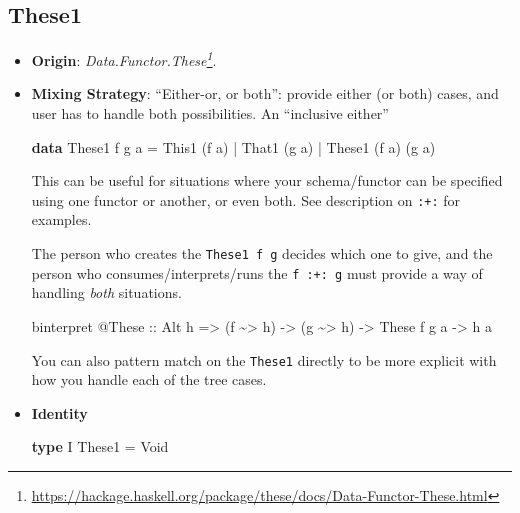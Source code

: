 \documentclass[]{article}
\newenvironment{Shaded}{}{}
\newcommand{\DataTypeTok}[1]{\textcolor[rgb]{0.56,0.13,0.00}{#1}}
\newcommand{\KeywordTok}[1]{\textcolor[rgb]{0.00,0.44,0.13}{\textbf{#1}}}
\newcommand{\NormalTok}[1]{#1}
\newcommand{\OperatorTok}[1]{\textcolor[rgb]{0.40,0.40,0.40}{#1}}
\newcommand{\OtherTok}[1]{\textcolor[rgb]{0.00,0.44,0.13}{#1}}
\renewcommand{\href}[2]{#2\footnote{\url{#1}}}
\begin{document}
\hypertarget{these1}{%
\subsection{These1}\label{these1}}

\begin{itemize}
\item
  \textbf{Origin}:
  \emph{\href{https://hackage.haskell.org/package/these/docs/Data-Functor-These.html}{Data.Functor.These}}.
\item
  \textbf{Mixing Strategy}: ``Either-or, or both'': provide either (or both)
  cases, and user has to handle both possibilities. An ``inclusive either''

\begin{Shaded}
\begin{Highlighting}[]
\KeywordTok{data} \DataTypeTok{These1}\NormalTok{ f g a}
    \OtherTok{=} \DataTypeTok{This1}\NormalTok{  (f a)}
    \OperatorTok{|} \DataTypeTok{That1}\NormalTok{        (g a)}
    \OperatorTok{|} \DataTypeTok{These1}\NormalTok{ (f a) (g a)}
\end{Highlighting}
\end{Shaded}

  This can be useful for situations where your schema/functor can be specified
  using one functor or another, or even both. See description on \texttt{:+:}
  for examples.

  The person who creates the \texttt{These1\ f\ g} decides which one to give,
  and the person who consumes/interprets/runs the \texttt{f\ :+:\ g} must
  provide a way of handling \emph{both} situations.

\begin{Shaded}
\begin{Highlighting}[]
\NormalTok{binterpret }\OperatorTok{@}\DataTypeTok{These}
\OtherTok{    ::} \DataTypeTok{Alt}\NormalTok{ h}
    \OtherTok{=>}\NormalTok{ (f }\OperatorTok{\textasciitilde{}>}\NormalTok{ h)}
    \OtherTok{{-}>}\NormalTok{ (g }\OperatorTok{\textasciitilde{}>}\NormalTok{ h)}
    \OtherTok{{-}>} \DataTypeTok{These}\NormalTok{ f g a}
    \OtherTok{{-}>}\NormalTok{ h a}
\end{Highlighting}
\end{Shaded}

  You can also pattern match on the \texttt{These1} directly to be more explicit
  with how you handle each of the tree cases.
\item
  \textbf{Identity}

\begin{Shaded}
\begin{Highlighting}[]
\KeywordTok{type} \DataTypeTok{I} \DataTypeTok{These1} \OtherTok{=} \DataTypeTok{Void}
\end{Highlighting}
\end{Shaded}


\end{itemize}
\end{document}
